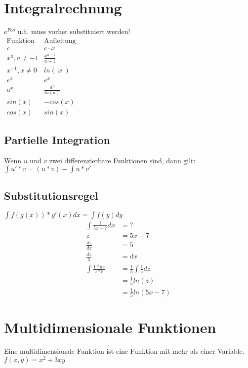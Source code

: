 \documentclass[a4paper,landscape, 11pt]{article}
\begin{document}
\begin{multicols}{4}
\begin{small}
    \section{Integralrechnung}
        $e^{Foo}$ u.ä. muss vorher substituiert werden!\\
        
        $
        \begin{matrix}
        \text{Funktion} & \text{Aufleitung} \\
        c & c \cdot x \\
        x^a, a \neq -1 & \frac{x^{a+1}}{a+1}\\
        x^{-1}, x \neq 0 & ln(|x|)\\
        e^x & e^x \\
        a^x & \frac{a^x}{ln(a)} \\
        sin(x) & -cos(x)\\
        cos(x) & sin(x)
        \end{matrix}
        $
        
        
        \subsection{Partielle Integration}
        Wenn $u$ und $v$ zwei differenzierbare Funktionen sind, dann gilt: \\
        $\int u' * v = (u * v) - \int u * v'$
        \subsection{Substitutionsregel}
        $\int f(g(x)) * g'(x) dx = \int f(y) dy$
        \begin{align}
            \int \frac{1}{5x - 7} dx &= ?\\
            z &= 5x - 7 \\
            \frac{dz}{dx} &= 5 \\   
            \frac{dz}{5} &= dx  \\
            \int \frac{1 * dz}{z * 5} &= \frac{1}{5} \int \frac{1}{z} dz \\
                                      &= \frac{1}{5} ln(z) \\
                                      &= \frac{1}{5} ln(5x-7)
        \end{align}
    \section{Multidimensionale Funktionen}
        Eine multidimensionale Funktion ist eine Funktion mit mehr als einer Variable.\\
       $f(x,y) = x^2 + 3xy$  
       

\end{small}
\end{multicols}
\end{document}
